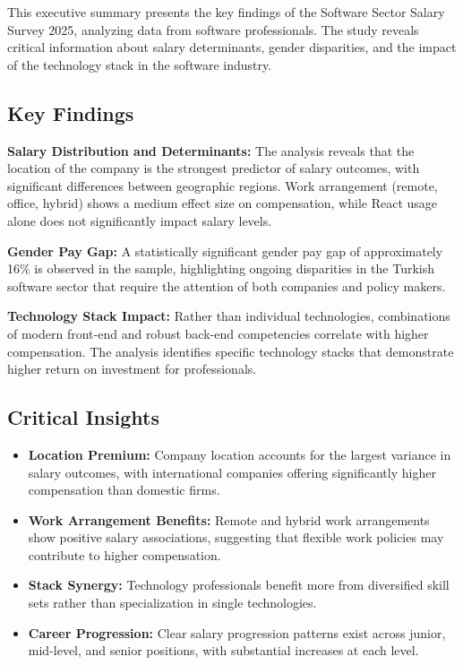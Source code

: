 This executive summary presents the key findings of the Software Sector Salary Survey 2025, analyzing data from \SampleSize{} software professionals. The study reveals critical information about salary determinants, gender disparities, and the impact of the technology stack in the software industry.

\subsection*{Key Findings}

\textbf{Salary Distribution and Determinants:} The analysis reveals that the location of the company is the strongest predictor of salary outcomes, with significant differences between geographic regions. Work arrangement (remote, office, hybrid) shows a medium effect size on compensation, while React usage alone does not significantly impact salary levels.

\textbf{Gender Pay Gap:} A statistically significant gender pay gap of approximately 16\% is observed in the sample, highlighting ongoing disparities in the Turkish software sector that require the attention of both companies and policy makers.

\textbf{Technology Stack Impact:} Rather than individual technologies, combinations of modern front-end and robust back-end competencies correlate with higher compensation. The analysis identifies specific technology stacks that demonstrate higher return on investment for professionals.

\subsection*{Critical Insights}

\begin{itemize}[leftmargin=*]
  \item \textbf{Location Premium:} Company location accounts for the largest variance in salary outcomes, with international companies offering significantly higher compensation than domestic firms.
  \item \textbf{Work Arrangement Benefits:} Remote and hybrid work arrangements show positive salary associations, suggesting that flexible work policies may contribute to higher compensation.
  \item \textbf{Stack Synergy:} Technology professionals benefit more from diversified skill sets rather than specialization in single technologies.
  \item \textbf{Career Progression:} Clear salary progression patterns exist across junior, mid-level, and senior positions, with substantial increases at each level.
\end{itemize}

